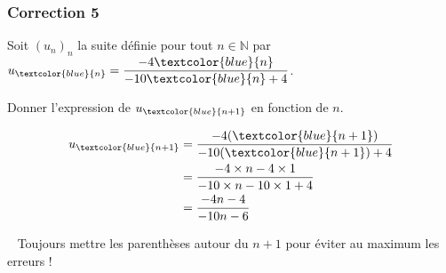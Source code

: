 \documentclass[15pt, mathserif]{beamer}
\newcommand{\N}{\mathbb{N}}			%
\begin{document}
\begin{frame}
\vspace{-10mm}
	\frametitle{Correction 5}
\vspace*{1cm} 
 Soit $(u_n)_n$ la suite définie pour tout $n \in \N$ par $u_{\textcolor{blue}{n}}=\dfrac{-4\textcolor{blue}{n}}{-10\textcolor{blue}{n}+4}$. 
 
 Donner l'expression de $u_{\textcolor{blue}{n+1}}$ en fonction de $n$. 
 
 \begin{align*} 
 u_{\textcolor{blue}{n+1}} 
 &= \dfrac{-4(\textcolor{blue}{n+1})}{-10(\textcolor{blue}{n+1})+4}\\ 
  &= \dfrac{-4\times n-4\times 1}{-10\times n-10\times 1 +4}\\ 
 &= \dfrac{-4n-4}{-10n-6} 
 \end{align*} 
 
 \bcattention ~ Toujours mettre les parenthèses autour du $n+1$ pour éviter au maximum les erreurs ! 
\end{frame}
\end{document}

